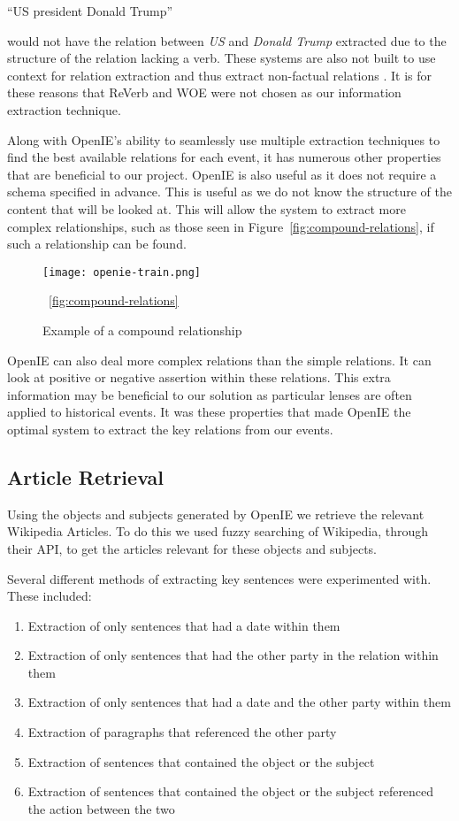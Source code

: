 \documentclass[bsc,frontabs,twoside,singlespacing,parskip,deptreport]{infthesis}     %
\begin{document}
``US president Donald Trump''

would not have the relation between \textit{US} and \textit{Donald Trump} extracted due to the structure of the relation lacking a verb.
These systems are also not built to use context for relation extraction and thus extract non-factual relations \cite{schmitz2012open}.
It is for these reasons that ReVerb and WOE were not chosen as our information extraction technique.


Along with OpenIE's ability to seamlessly use multiple extraction techniques to find the best available
relations for each event, it has numerous other properties that are beneficial to our project.
OpenIE is also useful as it does not require a schema specified in advance.
This is useful as we do not know the structure of the content that will be looked at.
This will allow the system to extract
more complex relationships, such as those seen in Figure~\ref{fig:compound-relations}, if such
a relationship can be found.


\begin{figure}[h]
  \centering
  \texttt{[image: openie-train.png]}
  \caption{Example of a compound relationship \cite{OpenIE}}
 ~\ref{fig:compound-relations}
  \end{figure}

OpenIE can also deal more complex relations  than the simple relations.
It can look at positive or negative assertion within these relations.
This extra information may be beneficial to our solution as particular lenses are often applied to historical events.
It was these properties that made OpenIE the optimal system to extract the key relations from our events.


\subsection{Article Retrieval}
Using the objects and subjects generated by OpenIE we retrieve the relevant Wikipedia Articles.
To do this we used fuzzy searching of Wikipedia, through their API, to get the articles relevant
for these objects and subjects.

Several different methods of extracting key sentences were experimented with.
These included:
\begin{enumerate}
  \item Extraction of only sentences that had a date within them
  \item Extraction of only sentences that had the other party in the relation within them
  \item Extraction of only sentences that had a date and the other party within them
  \item Extraction of paragraphs that referenced the other party
  \item Extraction of sentences that contained the object or the subject 
  \item Extraction of sentences that contained the object or the subject referenced the action between the two 
\end{enumerate}
\end{document}
